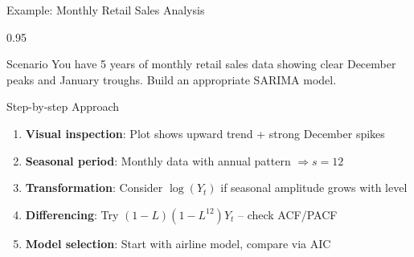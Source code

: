\documentclass[9pt, aspectratio=169, t]{beamer}
\begin{document}
\begin{frame}{Example: Monthly Retail Sales Analysis}
    \begin{cminipage}{0.95\textwidth}
    \begin{alertblock}{Scenario}
        You have 5 years of monthly retail sales data showing clear December peaks and January troughs. Build an appropriate SARIMA model.
    \end{alertblock}

    \vspace{0.2cm}

    \begin{exampleblock}{Step-by-step Approach}
        \begin{enumerate}
            \item \textbf{Visual inspection}: Plot shows upward trend + strong December spikes
            \item \textbf{Seasonal period}: Monthly data with annual pattern $\Rightarrow s = 12$
            \item \textbf{Transformation}: Consider $\log(Y_t)$ if seasonal amplitude grows with level
            \item \textbf{Differencing}: Try $(1-L)(1-L^{12})Y_t$ -- check ACF/PACF
            \item \textbf{Model selection}: Start with airline model, compare via AIC
        \end{enumerate}
    \end{exampleblock}
    \end{cminipage}
\end{frame}
\end{document}
